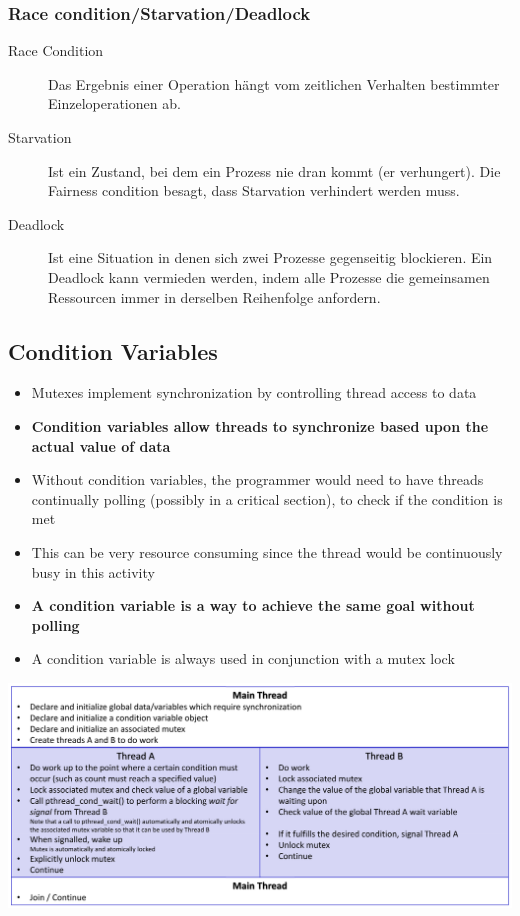 \subsubsection{Race condition/Starvation/Deadlock}
\begin{description}
  \item[Race Condition]  Das Ergebnis einer Operation hängt vom zeitlichen Verhalten bestimmter Einzeloperationen ab.
  \item[Starvation]      Ist ein Zustand, bei dem ein Prozess nie dran kommt (er verhungert). Die Fairness condition besagt, dass Starvation verhindert werden muss.
  \item[Deadlock]        Ist eine Situation in denen sich zwei Prozesse gegenseitig blockieren. Ein Deadlock kann vermieden werden, indem alle Prozesse die gemeinsamen Ressourcen immer in derselben Reihenfolge anfordern.
\end{description}

\subsection{Condition Variables}
\begin{itemize}
  \item Mutexes implement synchronization by controlling thread access to data
  \item \textbf{Condition variables allow threads to synchronize based upon the actual value of data}
  \item Without condition variables, the programmer would need to have threads continually polling (possibly in a critical section), to check if the condition is met
  \item This can be very resource consuming since the thread would be continuously busy in this activity
  \item \textbf{A condition variable is a way to achieve the same goal without polling}
  \item A condition variable is always used in conjunction with a mutex lock
\end{itemize}
\begin{center}
  \begin{minipage}{0.8\linewidth}
    \includegraphics[width=\linewidth]{images/Concurrency/conditionVariablesAblauf}
  \end{minipage}
\end{center}

